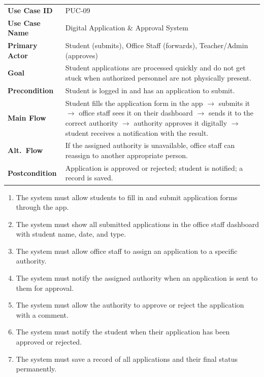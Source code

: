 \documentclass[12pt,a4paper]{article}
\begin{document}
\begin{tcolorbox}[pucbox, title={Product Use Case --- PUC-09}]
\begin{tabularx}{\linewidth}{p{3.5cm} X}
\textbf{Use Case ID}    & PUC-09 \\
\textbf{Use Case Name}  & Digital Application \& Approval System \\
\textbf{Primary Actor}  & Student (submits), Office Staff (forwards), Teacher/Admin (approves) \\
\textbf{Goal}           & Student applications are processed quickly and do not get stuck when authorized personnel are not physically present. \\
\textbf{Precondition}   & Student is logged in and has an application to submit. \\
\textbf{Main Flow}      & Student fills the application form in the app $\rightarrow$ submits it $\rightarrow$ office staff sees it on their dashboard $\rightarrow$ sends it to the correct authority $\rightarrow$ authority approves it digitally $\rightarrow$ student receives a notification with the result. \\
\textbf{Alt.\ Flow}     & If the assigned authority is unavailable, office staff can reassign to another appropriate person. \\
\textbf{Postcondition}  & Application is approved or rejected; student is notified; a record is saved. \\
\end{tabularx}
\end{tcolorbox}

\begin{tcolorbox}[frbox, title={Functional Requirements --- PUC-09}]
\begin{enumerate}[leftmargin=*, label=\textbf{FR-09.\arabic*}, itemsep=5pt]
  \item The system must allow students to fill in and submit application forms through the app.
  \item The system must show all submitted applications in the office staff dashboard with student name, date, and type.
  \item The system must allow office staff to assign an application to a specific authority.
  \item The system must notify the assigned authority when an application is sent to them for approval.
  \item The system must allow the authority to approve or reject the application with a comment.
  \item The system must notify the student when their application has been approved or rejected.
  \item The system must save a record of all applications and their final status permanently.
\end{enumerate}
\end{tcolorbox}
\end{document}
